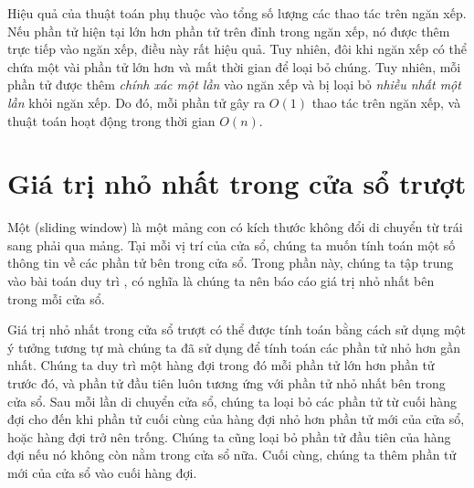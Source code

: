 \begin{center}
\end{center}

Hiệu quả của thuật toán phụ thuộc vào
tổng số lượng các thao tác trên ngăn xếp.
Nếu phần tử hiện tại lớn hơn
phần tử trên đỉnh trong ngăn xếp, nó được
thêm trực tiếp vào ngăn xếp, điều này rất hiệu quả.
Tuy nhiên, đôi khi ngăn xếp có thể chứa một vài
phần tử lớn hơn và mất thời gian để loại bỏ chúng.
Tuy nhiên, mỗi phần tử được thêm \emph{chính xác một lần} vào ngăn xếp
và bị loại bỏ \emph{nhiều nhất một lần} khỏi ngăn xếp.
Do đó, mỗi phần tử gây ra $O(1)$ thao tác trên ngăn xếp,
và thuật toán hoạt động trong thời gian $O(n)$.

\section{Giá trị nhỏ nhất trong cửa sổ trượt}


Một  (sliding window) là một mảng con có kích thước không đổi
di chuyển từ trái sang phải qua mảng.
Tại mỗi vị trí của cửa sổ,
chúng ta muốn tính toán một số thông tin
về các phần tử bên trong cửa sổ.
Trong phần này, chúng ta tập trung vào bài toán
duy trì ,
có nghĩa là
chúng ta nên báo cáo giá trị nhỏ nhất bên trong mỗi cửa sổ.

Giá trị nhỏ nhất trong cửa sổ trượt có thể được tính toán
bằng cách sử dụng một ý tưởng tương tự mà chúng ta đã sử dụng để tính toán
các phần tử nhỏ hơn gần nhất.
Chúng ta duy trì một hàng đợi
trong đó mỗi phần tử lớn hơn
phần tử trước đó,
và phần tử đầu tiên
luôn tương ứng với phần tử nhỏ nhất bên trong cửa sổ.
Sau mỗi lần di chuyển cửa sổ,
chúng ta loại bỏ các phần tử từ cuối hàng đợi
cho đến khi phần tử cuối cùng của hàng đợi
nhỏ hơn phần tử mới của cửa sổ,
hoặc hàng đợi trở nên trống.
Chúng ta cũng loại bỏ phần tử đầu tiên của hàng đợi
nếu nó không còn nằm trong cửa sổ nữa.
Cuối cùng, chúng ta thêm phần tử mới của cửa sổ
vào cuối hàng đợi.

